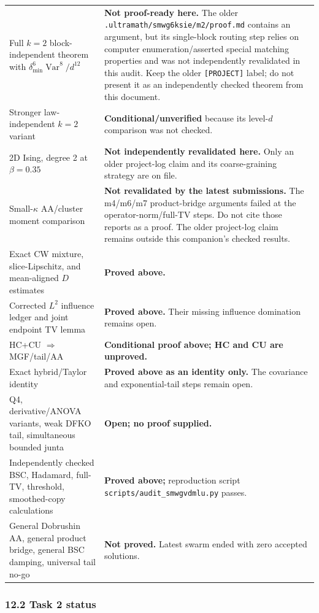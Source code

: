{\begin{longtable}[]{@{}
  >{\raggedright\arraybackslash}p{}
  >{\raggedright\arraybackslash}p{}@{}}
Full \(k=2\) block-independent theorem with \(\delta_{\min}^{6}\operatorname{Var}^8/d^{12}\) & \textbf{Not proof-ready here.} The older \texttt{.ultramath/smwg6ksie/m2/proof.md} contains an argument, but its single-block routing step relies on computer enumeration/asserted special matching properties and was not independently revalidated in this audit. Keep the older \texttt{{[}PROJECT{]}} label; do not present it as an independently checked theorem from this document. \\
Stronger law-independent \(k=2\) variant & \textbf{Conditional/unverified} because its level-\(d\) comparison was not checked. \\
2D Ising, degree 2 at \(\beta=0.35\) & \textbf{Not independently revalidated here.} Only an older project-log claim and its coarse-graining strategy are on file. \\
Small-\(\kappa\) AA/cluster moment comparison & \textbf{Not revalidated by the latest submissions.} The m4/m6/m7 product-bridge arguments failed at the operator-norm/full-TV steps. Do not cite those reports as a proof. The older project-log claim remains outside this companion's checked results. \\
Exact CW mixture, slice-Lipschitz, and mean-aligned \(D\) estimates & \textbf{Proved above.} \\
Corrected \(L^2\) influence ledger and joint endpoint TV lemma & \textbf{Proved above.} Their missing influence domination remains open. \\
HC+CU \(\Rightarrow\) MGF/tail/AA & \textbf{Conditional proof above; HC and CU are unproved.} \\
Exact hybrid/Taylor identity & \textbf{Proved above as an identity only.} The covariance and exponential-tail steps remain open. \\
Q4, derivative/ANOVA variants, weak DFKO tail, simultaneous bounded junta & \textbf{Open; no proof supplied.} \\
Independently checked BSC, Hadamard, full-TV, threshold, smoothed-copy calculations & \textbf{Proved above;} reproduction script \texttt{scripts/audit\_smwgvdmlu.py} passes. \\
General Dobrushin AA, general product bridge, general BSC damping, universal tail no-go & \textbf{Not proved.} Latest swarm ended with zero accepted solutions. \\
\end{longtable}
}

\subsubsection{12.2 Task 2 status}\label{task-2-status}

